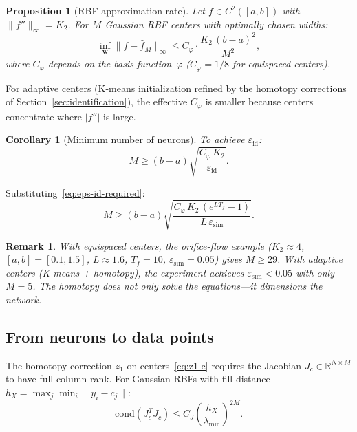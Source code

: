 \documentclass[11pt,a4paper]{article}
\newtheorem{proposition}[theorem]{Proposition}
\newtheorem{corollary}[theorem]{Corollary}
\newtheorem{remark}[theorem]{Remark}
\begin{document}
\begin{proposition}[RBF approximation rate]\label{prop:rbf-rate}
Let $f \in C^2([a,b])$ with $\|f''\|_\infty = K_2$. For $M$ Gaussian RBF centers with optimally chosen widths:
\begin{equation}
\inf_{\mathbf{w}} \|f - \hat{f}_M\|_\infty \leq C_\varphi \cdot \frac{K_2\,(b-a)^2}{M^2},
\label{eq:rbf-rate}
\end{equation}
where $C_\varphi$ depends on the basis function~$\varphi$ ($C_\varphi = 1/8$ for equispaced centers).
\end{proposition}

For adaptive centers (K-means initialization refined by the homotopy corrections of Section~\ref{sec:identification}), the effective $C_\varphi$ is smaller because centers concentrate where $|f''|$ is large.

\begin{corollary}[Minimum number of neurons]\label{cor:Mmin}
To achieve $\varepsilon_{\mathrm{id}}$:
\begin{equation}
M \geq (b-a)\sqrt{\frac{C_\varphi\,K_2}{\varepsilon_{\mathrm{id}}}}.
\label{eq:Mmin}
\end{equation}
\end{corollary}

Substituting~\eqref{eq:eps-id-required}:
\begin{equation}
M \geq (b-a)\sqrt{\frac{C_\varphi\,K_2\,(e^{LT_f}-1)}{L\,\varepsilon_{\mathrm{sim}}}}.
\label{eq:Mmin-full}
\end{equation}

\begin{remark}
With equispaced centers, the orifice-flow example ($K_2 \approx 4$, $[a,b] = [0.1, 1.5]$, $L \approx 1.6$, $T_f = 10$, $\varepsilon_{\mathrm{sim}} = 0.05$) gives $M \geq 29$. With adaptive centers (K-means + homotopy), the experiment achieves $\varepsilon_{\mathrm{sim}} < 0.05$ with only $M = 5$. The homotopy does not only solve the equations---it dimensions the network.
\end{remark}

\subsection{From neurons to data points}

The homotopy correction $z_1$ on centers~\eqref{eq:z1-c} requires the Jacobian $J_c \in \mathbb{R}^{N \times M}$ to have full column rank. For Gaussian RBFs with fill distance $h_X = \max_j \min_i \|y_i - c_j\|$:
\begin{equation}
\mathrm{cond}(J_c^T J_c) \leq C_J\!\left(\frac{h_X}{\lambda_{\min}}\right)^{2M}.
\label{eq:cond-Jc}
\end{equation}
\end{document}
